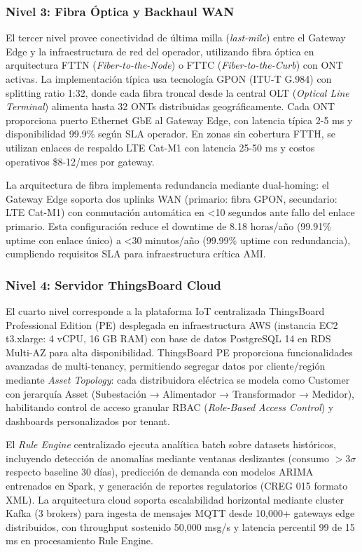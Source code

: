 \subsubsection{Nivel 3: Fibra Óptica y Backhaul WAN}

El tercer nivel provee conectividad de última milla (\textit{last-mile}) entre el Gateway Edge y la infraestructura de red del operador, utilizando fibra óptica en arquitectura FTTN (\textit{Fiber-to-the-Node}) o FTTC (\textit{Fiber-to-the-Curb}) con ONT activas. La implementación típica usa tecnología GPON (ITU-T G.984) con splitting ratio 1:32, donde cada fibra troncal desde la central OLT (\textit{Optical Line Terminal}) alimenta hasta 32 ONTs distribuidas geográficamente. Cada ONT proporciona puerto Ethernet GbE al Gateway Edge, con latencia típica 2-5 ms y disponibilidad 99.9\% según SLA operador. En zonas sin cobertura FTTH, se utilizan enlaces de respaldo LTE Cat-M1 con latencia 25-50 ms y costos operativos \$8-12/mes por gateway.

La arquitectura de fibra implementa redundancia mediante dual-homing: el Gateway Edge soporta dos uplinks WAN (primario: fibra GPON, secundario: LTE Cat-M1) con conmutación automática en <10 segundos ante fallo del enlace primario. Esta configuración reduce el downtime de 8.18 horas/año (99.91\% uptime con enlace único) a <30 minutos/año (99.99\% uptime con redundancia), cumpliendo requisitos SLA para infraestructura crítica AMI.

\subsubsection{Nivel 4: Servidor ThingsBoard Cloud}

El cuarto nivel corresponde a la plataforma IoT centralizada ThingsBoard Professional Edition (PE) desplegada en infraestructura AWS (instancia EC2 t3.xlarge: 4 vCPU, 16 GB RAM) con base de datos PostgreSQL 14 en RDS Multi-AZ para alta disponibilidad. ThingsBoard PE proporciona funcionalidades avanzadas de multi-tenancy, permitiendo segregar datos por cliente/región mediante \textit{Asset Topology}: cada distribuidora eléctrica se modela como Customer con jerarquía Asset (Subestación → Alimentador → Transformador → Medidor), habilitando control de acceso granular RBAC (\textit{Role-Based Access Control}) y dashboards personalizados por tenant.

El \textit{Rule Engine} centralizado ejecuta analítica batch sobre datasets históricos, incluyendo detección de anomalías mediante ventanas deslizantes (consumo $>3\sigma$ respecto baseline 30 días), predicción de demanda con modelos ARIMA entrenados en Spark, y generación de reportes regulatorios (CREG 015 formato XML). La arquitectura cloud soporta escalabilidad horizontal mediante cluster Kafka (3 brokers) para ingesta de mensajes MQTT desde 10,000+ gateways edge distribuidos, con throughput sostenido 50,000 msg/s y latencia percentil 99 de 15 ms en procesamiento Rule Engine.

